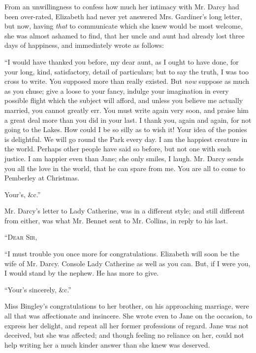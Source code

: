 From an unwillingness to confess how much her intimacy
with Mr. Darcy had been over-rated, Elizabeth had never
yet answered Mrs. Gardiner’s long letter, but now, having
\textit{that} to communicate which she knew would be most
welcome, she was almost ashamed to find, that her uncle
and aunt had already lost three days of happiness, and
immediately wrote as follows:

\begin{letter}
“I would have thanked you before, my dear aunt, as
I ought to have done, for your long, kind, satisfactory,
detail of particulars; but to say the truth, I was too
cross to write. You supposed more than really existed.
But \textit{now} suppose as much as you chuse; give a loose to
your fancy, indulge your imagination in every possible
flight which the subject will afford, and unless you believe
me actually married, you cannot greatly err. You must
write again very soon, and praise him a great deal more
than you did in your last. I thank you, again and again,
for not going to the Lakes. How could I be so silly as
to wish it! Your idea of the ponies is delightful. We
will go round the Park every day. I am the happiest
creature in the world. Perhaps other people have said
so before, but not one with such justice. I am happier
even than Jane; she only smiles, I laugh. Mr. Darcy
sends you all the love in the world, that he can spare from
me. You are all to come to Pemberley at Christmas.

\raggedleft Your’s, \&c.”
\end{letter}

Mr. Darcy’s letter to Lady Catherine, was in a different
style; and still different from either, was what Mr. Bennet
sent to Mr. Collins, in reply to his last.

\begin{letter}
“\textsc{Dear Sir},

“I must trouble you once more for congratulations.
Elizabeth will soon be the wife of Mr. Darcy. Console
Lady Catherine as well as you can. But, if I were you,
I would stand by the nephew. He has more to give.

\raggedleft “Your’s sincerely, \&c.”
\end{letter}

Miss Bingley’s congratulations to her brother, on his
approaching marriage, were all that was affectionate and
insincere. She wrote even to Jane on the occasion, to
express her delight, and repeat all her former professions
of regard. Jane was not deceived, but she was affected;
and though feeling no reliance on her, could not help
writing her a much kinder answer than she knew was
deserved.

